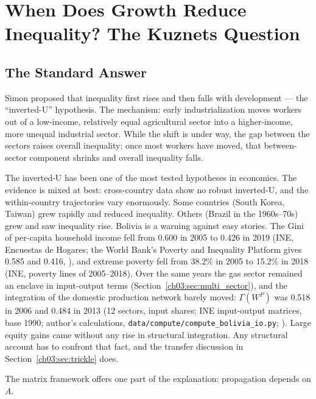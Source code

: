 \documentclass[../structural_economics_book.tex]{subfiles}
\begin{document}
\section{When Does Growth Reduce Inequality? The Kuznets Question}
\label{ch03:sec:kuznets}

\subsection{The Standard Answer}

Simon \citet{kuznets1955economic} proposed that inequality first rises and then falls with development --- the ``inverted-U'' hypothesis. The mechanism: early industrialization moves workers out of a low-income, relatively equal agricultural sector into a higher-income, more unequal industrial sector. While the shift is under way, the gap between the sectors raises overall inequality; once most workers have moved, that between-sector component shrinks and overall inequality falls.

The inverted-U has been one of the most tested hypotheses in economics. The evidence is mixed at best: cross-country data show no robust inverted-U, and the within-country trajectories vary enormously. Some countries (South Korea, Taiwan) grew rapidly and reduced inequality. Others (Brazil in the 1960s--70s) grew and saw inequality rise. Bolivia is a warning against easy stories. The Gini of per-capita household income fell from 0.600 in 2005 to 0.426 in 2019 (INE, Encuestas de Hogares; the World Bank's Poverty and Inequality Platform gives 0.585 and 0.416, \citealp{worldbank2026pip}), and extreme poverty fell from 38.2\% in 2005 to 15.2\% in 2018 (INE, poverty lines of 2005--2018). Over the same years the gas sector remained an enclave in input-output terms (Section~\ref{ch03:sec:multi_sector}), and the integration of the domestic production network barely moved: $\Gamma(W^P)$ was 0.518 in 2006 and 0.484 in 2013 (12 sectors, input shares; INE input-output matrices, base 1990; author's calculations, \texttt{data/compute/compute\_bolivia\_io.py}; \citealp{ine2026sut}). Large equity gains came without any rise in structural integration. Any structural account has to confront that fact, and the transfer discussion in Section~\ref{ch03:sec:trickle} does.

The matrix framework offers one part of the explanation: propagation depends on $A$.
\end{document}

